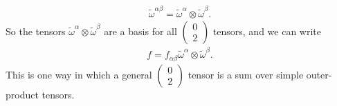 \documentclass[12pt]{book}
\begin{document}
    \begin{align}
    \tilde{\omega}^{\alpha\beta} = \tilde{\omega}^\alpha \otimes \tilde{\omega}^\beta. \tag{3.25}
    \end{align}
    So the tensors \(\tilde{\omega}^\alpha \otimes \tilde{\omega}^\beta\) are a basis for all \(\left(\begin{array}{c} 0 \\ 2 \end{array}\right)\) tensors, and we can write
    \begin{align}
    f = f_{\alpha\beta} \tilde{\omega}^\alpha \otimes \tilde{\omega}^\beta. \tag{3.26}
    \end{align}
    This is one way in which a general \(\left(\begin{array}{c} 0 \\ 2 \end{array}\right)\) tensor is a sum over simple outer-product tensors.
    
\end{document}
